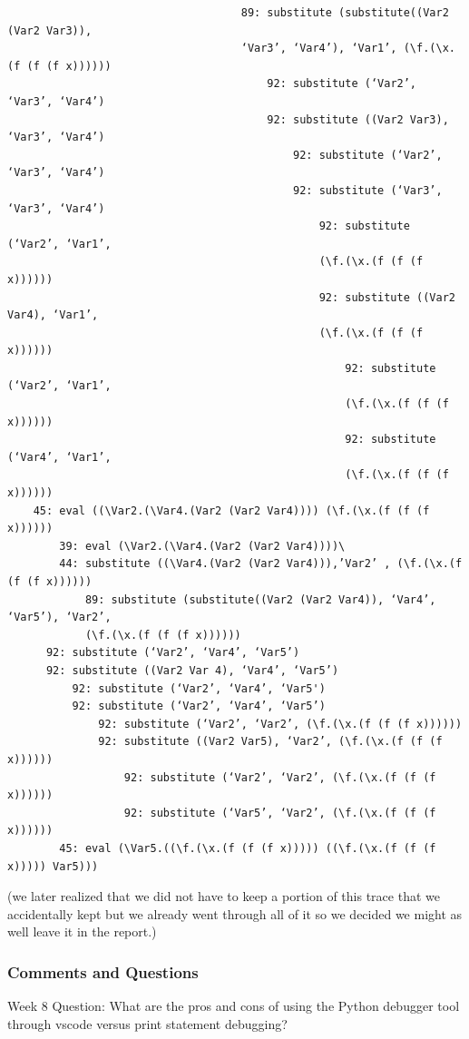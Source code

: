 \documentclass{article}
\theoremstyle{theorem}
\theoremstyle{definition}
\theoremstyle{remark}
\begin{document}
\begin{enumerate}
\begin{verbatim}
                                    89: substitute (substitute((Var2 (Var2 Var3)),
                                    ‘Var3’, ‘Var4’), ‘Var1’, (\f.(\x.(f (f (f x))))))
                                        92: substitute (‘Var2’, ‘Var3’, ‘Var4’)
                                        92: substitute ((Var2 Var3), ‘Var3’, ‘Var4’)
                                            92: substitute (‘Var2’, ‘Var3’, ‘Var4’)
                                            92: substitute (‘Var3’, ‘Var3’, ‘Var4’)
                                                92: substitute (‘Var2’, ‘Var1’,
                                                (\f.(\x.(f (f (f x))))))
                                                92: substitute ((Var2 Var4), ‘Var1’,
                                                (\f.(\x.(f (f (f x))))))
                                                    92: substitute (‘Var2’, ‘Var1’,
                                                    (\f.(\x.(f (f (f x))))))
                                                    92: substitute (‘Var4’, ‘Var1’,
                                                    (\f.(\x.(f (f (f x))))))
    45: eval ((\Var2.(\Var4.(Var2 (Var2 Var4)))) (\f.(\x.(f (f (f x))))))
        39: eval (\Var2.(\Var4.(Var2 (Var2 Var4))))\
        44: substitute ((\Var4.(Var2 (Var2 Var4))),’Var2’ , (\f.(\x.(f (f (f x))))))
            89: substitute (substitute((Var2 (Var2 Var4)), ‘Var4’, ‘Var5’), ‘Var2’,
            (\f.(\x.(f (f (f x))))))
      92: substitute (‘Var2’, ‘Var4’, ‘Var5’)
      92: substitute ((Var2 Var 4), ‘Var4’, ‘Var5’)
          92: substitute (‘Var2’, ‘Var4’, ‘Var5')
          92: substitute (‘Var2’, ‘Var4’, ‘Var5’)
              92: substitute (‘Var2’, ‘Var2’, (\f.(\x.(f (f (f x))))))
              92: substitute ((Var2 Var5), ‘Var2’, (\f.(\x.(f (f (f x))))))
                  92: substitute (‘Var2’, ‘Var2’, (\f.(\x.(f (f (f x))))))
                  92: substitute (‘Var5’, ‘Var2’, (\f.(\x.(f (f (f x))))))
        45: eval (\Var5.((\f.(\x.(f (f (f x))))) ((\f.(\x.(f (f (f x))))) Var5)))
  \end{verbatim}
     (we later realized that we did not have to keep a portion of this trace that we accidentally kept but we already went
     through all of it so we decided we might as well leave it in the report.)
\end{enumerate}
\subsubsection*{Comments and Questions}
Week 8 Question: What are the pros and cons of using the Python debugger tool through vscode 
versus print statement debugging?
\end{document}
